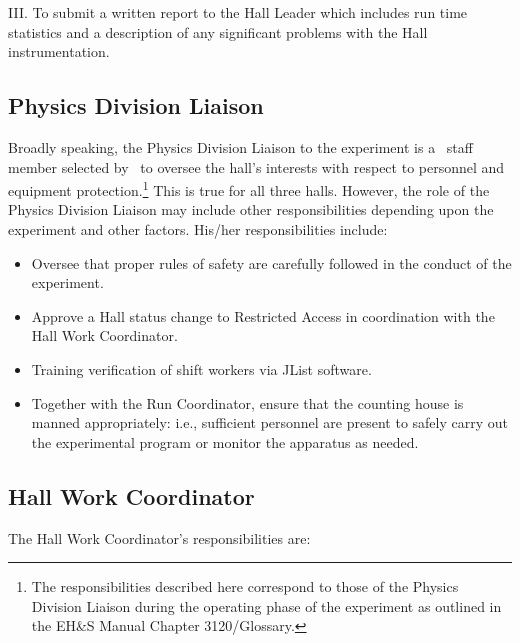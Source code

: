 \documentclass[10pt]{article}
\begin{document}
\noindent III. To submit a written report to the Hall Leader which includes
run time statistics and a description of any significant problems with the 
Hall instrumentation.


\subsection{Physics Division Liaison}

Broadly speaking, the Physics Division Liaison to the experiment 
is a \HALL\ staff member selected by \HALLLEADER\
to oversee the hall's interests with respect to personnel and equipment 
protection.\footnote{The responsibilities described here correspond 
to those of the Physics Division Liaison during
the operating phase of the experiment as outlined in the
EH\&S Manual Chapter 3120/Glossary.} 
This is true for all three halls. However, the role of
the Physics Division Liaison may include other responsibilities
depending upon the experiment and other factors. His/her responsibilities
include:
\begin{itemize}
\item Oversee that proper rules of safety are carefully followed in the 
conduct of the experiment.
\item Approve a Hall status change to Restricted Access in coordination
with the Hall Work Coordinator.
\item Training verification of shift workers via JList software.
\item Together with the Run Coordinator, 
ensure that the counting house is manned appropriately: i.e.,
sufficient personnel are present to safely carry out the experimental 
program or monitor the apparatus as needed.
\end{itemize}  

\subsection{Hall Work Coordinator}

The Hall Work Coordinator's responsibilities are: 
\end{document}

